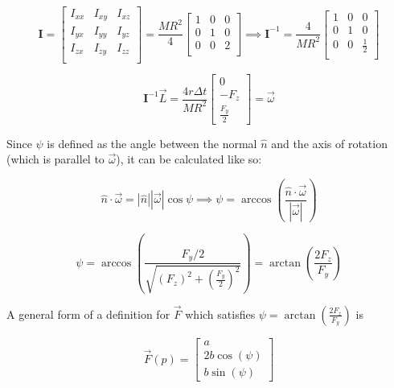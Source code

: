 \documentclass[english,12pt,a4paper,final]{article}
\begin{document}
\begin{equation*}
	\mathbf{I}
	=
	\begin{bmatrix}
		I_{xx} & I_{xy} & I_{xz} \\
		I_{yx} & I_{yy} & I_{yz} \\
		I_{zx} & I_{zy} & I_{zz} \\
	\end{bmatrix}
	=
	\frac{MR^2}{4}
	\begin{bmatrix}
		1 & 0 & 0 \\
		0 & 1 & 0 \\
		0 & 0 & 2 \\
	\end{bmatrix}
	\implies
	\mathbf{I}^{-1}
	=
	\frac{4}{MR^2}
	\begin{bmatrix}
		1 & 0 & 0 \\
		0 & 1 & 0 \\
		0 & 0 & \frac{1}{2} \\
	\end{bmatrix}
\end{equation*}

\begin{equation*}
	\mathbf{I}^{-1} \vec{L} = \frac{4r\Delta t}{MR^2} \begin{bmatrix}0\\- F_z \\ \frac{F_y}{2} \end{bmatrix} = \vec{\omega}
\end{equation*}

Since $\psi$ is defined as the angle between the normal $\hat{n}$ and the axis of rotation (which is parallel to $\vec{\omega}$), it can be calculated like so:

\begin{equation*}
	\hat{n} \cdot \vec{\omega} = |\hat{n}| |\vec{\omega}| \cos\psi \implies \psi = \arccos\left(\frac{\hat{n}\cdot\vec{\omega}}{|\vec{\omega}|}\right)
\end{equation*}

\begin{equation*}
	\psi = \arccos \left(\frac{F_y/2}{\sqrt{(F_z)^2+(\frac{F_y}{2})^2}}\right) = \arctan\left(\frac{2F_z}{F_y}\right)
\end{equation*}

A general form of a definition for $\vec{F}$ which satisfies $\psi = \arctan\left(\frac{2F_z}{F_y}\right)$ is

\begin{equation*}
	\vec{F}(p) = \begin{bmatrix}a\\2b\cos\left(\psi\right)\\b\sin\left(\psi\right)\end{bmatrix}
\end{equation*}
\end{document}
